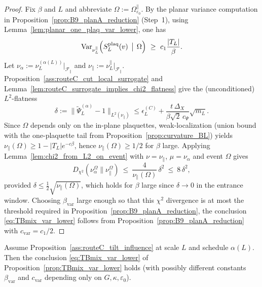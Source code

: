 \begin{proof}
Fix $\beta$ and $L$ and abbreviate $\Omega:=\Omega_{\varepsilon_0}^{\parallel}$.
By the planar variance computation in Proposition~\ref{prop:B9_planA_reduction} (Step~1), using Lemma~\ref{lem:planar_one_plaq_var_lower}, one has
\[
\mathrm{Var}_{\nu_L^{\parallel}}\!\left(S_L^{\mathrm{plaq}}(v)\,\bigm|\,\Omega\right)\ \ge\ c_1\frac{|T_L|}{\beta}.
\]
Let $\nu_{\alpha}:=\nu_L^{(\alpha(L))}|_{\mathscr F_{\parallel}}$ and $\nu_{\parallel}:=\nu_L^{\parallel}|_{\mathscr F_{\parallel}}$.
Proposition~\ref{ass:routeC_cut_local_surrogate} and Lemma~\ref{lem:routeC_surrogate_implies_chi2_flatness} give the (unconditioned) $L^2$-flatness
\[
\delta:=\bigl\|\widetilde\Psi_L^{(\alpha)}-1\bigr\|_{L^2(\nu_{\parallel})}
\le \epsilon_L^{(C)}+\frac{t\,\Delta_X}{\beta\sqrt2\,c_{\Psi}}\sqrt{m_L}.
\]
Since $\Omega$ depends only on the in-plane plaquettes, weak-localization (union bound with the one-plaquette tail from Proposition~\ref{prop:curvature_BL})
yields $\nu_{\parallel}(\Omega)\ge 1-|T_L|e^{-c\beta}$, hence $\nu_{\parallel}(\Omega)\ge 1/2$ for $\beta$ large.
Applying Lemma~\ref{lem:chi2_from_L2_on_event} with $\nu=\nu_{\parallel}$, $\mu=\nu_{\alpha}$ and event $\Omega$ gives
\[
D_{\chi^2}\!\left(\nu_{\alpha}^{\Omega}\Big\|\nu_{\parallel}^{\Omega}\right)
\ \le\ \frac{4}{\nu_{\parallel}(\Omega)}\,\delta^2
\ \le\ 8\,\delta^2,
\]
provided $\delta\le \tfrac12\sqrt{\nu_{\parallel}(\Omega)}$, which holds for $\beta$ large since $\delta\to 0$ in the entrance window.
Choosing $\beta_{\mathrm{var}}$ large enough so that this $\chi^2$ divergence is at most the threshold required in
Proposition~\ref{prop:B9_planA_reduction}, the conclusion \eqref{eq:TBmix_var_lower} follows from Proposition~\ref{prop:B9_planA_reduction}
with $c_{\mathrm{var}}=c_1/2$.
\end{proof}


\begin{corollary}\label{cor:TBmix_var_lower_influence}
Assume Proposition~\ref{ass:routeC_tilt_influence} at scale $L$ and schedule $\alpha(L)$.
Then the conclusion \eqref{eq:TBmix_var_lower} of Proposition~\ref{prop:TBmix_var_lower} holds
(with possibly different constants $\beta_{\mathrm{var}}$ and $c_{\mathrm{var}}$ depending only on $G,\kappa,\varepsilon_0$).
\end{corollary}

